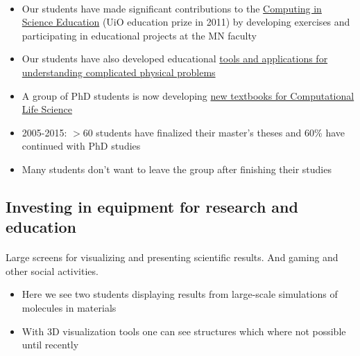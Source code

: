 \documentclass[%
twoside,                 %
final,                   %
10pt]{article}
\begin{document}
\paragraph{}
\begin{itemize}
\item Our students have made significant contributions to  the \href{{http://www.mn.uio.no/english/about/collaboration/cse/}}{Computing in Science Education}  (UiO education prize in 2011) by developing exercises and participating in educational projects at the MN faculty

\item Our students have also developed educational \href{{http://www.mn.uio.no/fysikk/om/aktuelt/aktuelle-saker/2015/realfagsapper.html}}{tools and applications for understanding complicated physical problems}

\item A group of PhD students is now developing \href{{https://github.com/CINPLA/ibvcse}}{new textbooks for Computational Life Science}

\item 2005-2015: $> 60$ students have finalized their master's theses and 60\% have continued with PhD studies

\item Many students don't want to leave the group after finishing their studies
\end{itemize}

\noindent






\subsection*{Investing in equipment for research and education}

\paragraph{}
Large screens for visualizing and presenting scientific results. And gaming and other social activities. 
\begin{itemize}
\item Here we see two students displaying results from large-scale simulations of molecules in materials

\item With 3D visualization tools one can see structures which where not possible until recently
\end{itemize}
\end{document}
